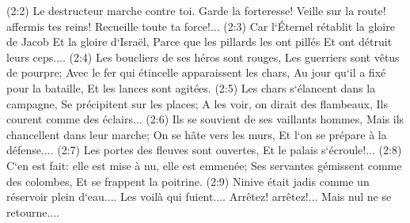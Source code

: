 \verse (2:2) Le destructeur marche contre toi. Garde la forteresse! Veille sur la route! affermis tes reins! Recueille toute ta force!... 
\verse (2:3) Car l`Éternel rétablit la gloire de Jacob Et la gloire d`Israël, Parce que les pillards les ont pillés Et ont détruit leurs ceps.... 
\verse (2:4) Les boucliers de ses héros sont rouges, Les guerriers sont vêtus de pourpre; Avec le fer qui étincelle apparaissent les chars, Au jour qu`il a fixé pour la bataille, Et les lances sont agitées. 
\verse (2:5) Les chars s`élancent dans la campagne, Se précipitent sur les places; A les voir, on dirait des flambeaux, Ils courent comme des éclairs... 
\verse (2:6) Ils se souvient de ses vaillants hommes, Mais ils chancellent dans leur marche; On se hâte vers les murs, Et l`on se prépare à la défense.... 
\verse (2:7) Les portes des fleuves sont ouvertes, Et le palais s`écroule!... 
\verse (2:8) C`en est fait: elle est mise à nu, elle est emmenée; Ses servantes gémissent comme des colombes, Et se frappent la poitrine. 
\verse (2:9) Ninive était jadis comme un réservoir plein d`eau.... Les voilà qui fuient.... Arrêtez! arrêtez!... Mais nul ne se retourne.... 
